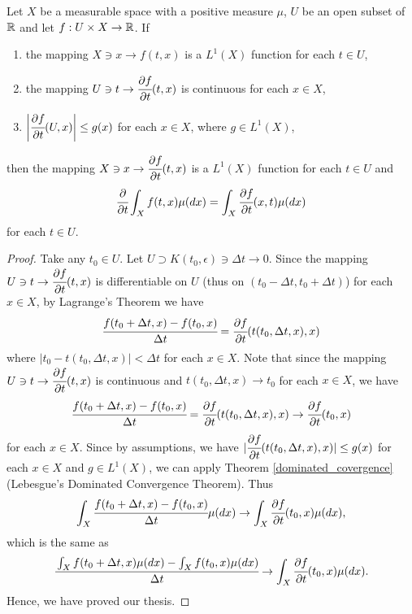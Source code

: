 \documentclass[main.tex]{subfiles}
\begin{document}
\begin{theorem}
\label{lim_under_int_helper}
Let $X$ be a measurable space with a positive measure $\mu$, $U$ be an open subset of $\mathbb{R}$ and let $f:U\times X\to\mathbb{R}$. If
\begin{enumerate}
\item
the mapping $X\ni x \to f(t, x)$ is a $L^1(X)$ function for each $t\in U$,

\item
the mapping $U\ni t \to \cfrac{\partial f}{\partial t}(t,x)$ is continuous for each $x\in X$,

\item
$\bigg\rvert\cfrac{\partial f}{\partial t}(U, x)\bigg\lvert \leq g(x)$ for each $x\in X$, where $g\in L^1(X)$,
\end{enumerate}
then
the mapping $X\ni x \to \cfrac{\partial f}{\partial t}(t, x)$ is a $L^1(X)$ function for each $t\in U$ and
\begin{equation}
\cfrac{\partial }{\partial t}\int_X f(t, x) \mu(dx) = \int_X \cfrac{\partial f}{\partial t}(x, t) \mu(dx)  
\end{equation}
for each $t\in U$.

\end{theorem}
\begin{proof}
Take any $t_0 \in U$. Let $U \supset K(t_0, \epsilon) \ni \Delta t \to 0.$
Since the mapping $U\ni t \to \cfrac{\partial f}{\partial t}(t,x)$ is differentiable on $U$ (thus on $(t_0 - \Delta t, t_0 + \Delta t)$) for each $x\in X$, by Lagrange's Theorem we have
\begin{equation}
    \cfrac{f(t_0 + \Delta t, x) - f(t_0, x)}{\Delta t} =
    \cfrac{\partial f}{\partial t}(t(t_0, \Delta t, x), x)
\end{equation}
where $|t_0 - t(t_0, \Delta t, x)| < \Delta t$ for each $x\in X$.
Note that since the mapping $U\ni t \to \cfrac{\partial f}{\partial t}(t,x)$ is continuous and $t(t_0, \Delta t, x) \to t_0$ for each $x\in X$, we have
\begin{equation}
    \cfrac{f(t_0 + \Delta t, x) - f(t_0, x)}{\Delta t} =
    \cfrac{\partial f}{\partial t}(t(t_0, \Delta t, x), x) \to \cfrac{\partial f}{\partial t}(t_0, x)
\end{equation}
for each $x\in X$.
Since by assumptions, we have $|\cfrac{\partial f}{\partial t}(t(t_0, \Delta t, x), x)| \leq g(x)$ for each $x\in X$ and $g\in L^1(X)$, we can apply Theorem \ref{dominated_covergence} (Lebesgue's Dominated Convergence Theorem).
Thus
\begin{equation}
    \int_X  \cfrac{f(t_0 + \Delta t, x) - f(t_0, x)}{\Delta t} \mu(dx) \to \int_X \cfrac{\partial f}{\partial t}(t_0, x) \mu(dx),
\end{equation}
which is the same as
\begin{equation}
    \cfrac{\int_X f(t_0 + \Delta t, x) \mu(dx) - \int_X f(t_0, x) \mu(dx)}{\Delta t}  \to \int_X \cfrac{\partial f}{\partial t}(t_0, x) \mu(dx).
\end{equation}
Hence, we have proved our thesis.
\end{proof}
\end{document}
